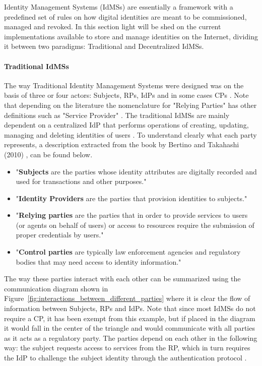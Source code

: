 Identity Management Systems (IdMSs) are essentially a framework with a predefined set of rules on how digital identities are meant to be commissioned, managed and revoked. In this section light will be shed on the current implementations available to store and manage identities on the Internet, dividing it between two paradigms: Traditional and Decentralized IdMSs.

\paragraph{Traditional IdMSs}

The way Traditional Identity Management Systems were designed was on the basis of three or four actors: Subjects, \glspl{RP}, \glspl{IdP} and in some cases \glspl{CP} \cite{bertino2010identity}. Note that depending on the literature the nomenclature for "Relying Parties" has other definitions such as "Service Provider" \cite{zhu2018identity}. The traditional IdMSs are mainly dependent on a centralized IdP that performs operations of creating, updating, managing and deleting identities of users \cite{gebresilassie2020distributed}. To understand clearly what each party represents, a description extracted from the book by Bertino and Takahashi (2010) \cite{bertino2010identity}, can be found below.
\begin{itemize}
    \item "\textbf{Subjects} are the parties whose identity attributes are digitally recorded and used for transactions and other purposes."
    \item "\textbf{Identity Providers} are the parties that provision identities to subjects."
    \item "\textbf{Relying parties} are the parties that in order to provide services to users (or agents on behalf of users) or access to resources require the submission of proper credentials by users."
    \item "\textbf{Control parties} are typically law enforcement agencies and regulatory bodies that may need access to identity information."
\end{itemize}

The way these parties interact with each other can be summarized using the communication diagram shown in Figure~\ref{fig:interactions_between_different_parties} where it is clear the flow of information between Subjects, RPs and IdPs. Note that since most IdMSs do not require a CP, it has been exempt from this example, but if placed in the diagram it would fall in the center of the triangle and would communicate with all parties as it acts as a regulatory party. The parties depend on each other in the following way: the subject requests access to services from the RP, which in turn requires the IdP to challenge the subject identity through the authentication protocol \cite{zhu2018identity}.

